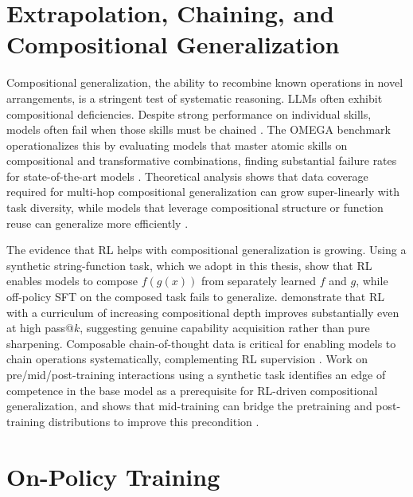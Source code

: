 \documentclass[12pt]{cmuthesis}
\begin{document}
\section{Extrapolation, Chaining, and Compositional Generalization}

Compositional generalization, the ability to recombine known operations in novel arrangements, is a stringent test of systematic reasoning.
LLMs often exhibit compositional deficiencies. Despite strong performance on individual skills, models often fail when those skills must be chained \citep{pressMeasuringNarrowingCompositionality2023,zhaoExploringCompositionalDeficiency2024}.
The OMEGA benchmark operationalizes this by evaluating models that master atomic skills on compositional and transformative combinations, finding substantial failure rates for state-of-the-art models \citep{sunOMEGACanLLMs2025}.
Theoretical analysis shows that data coverage required for multi-hop compositional generalization can grow super-linearly with task diversity, while models that leverage compositional structure or function reuse can generalize more efficiently \citep{abedsoltanTaskGeneralizationAutoRegressive2025}.

The evidence that RL helps with compositional generalization is growing.
Using a synthetic string-function task, which we adopt in this thesis, \citet{yuanLLMsLearnNewSkills2025} show that RL enables models to compose $f(g(x))$ from separately learned $f$ and $g$, while off-policy SFT on the composed task fails to generalize.
\citet{motwaniH1BootstrappingLLMs2025} demonstrate that RL with a curriculum of increasing compositional depth improves substantially even at high pass@$k$, suggesting genuine capability acquisition rather than pure sharpening.
Composable chain-of-thought data is critical for enabling models to chain operations systematically, complementing RL supervision \citep{yinLearningComposableChainsofThought2025}.
Work on pre/mid/post-training interactions using a synthetic task identifies an edge of competence in the base model as a prerequisite for RL-driven compositional generalization, and shows that mid-training can bridge the pretraining and post-training distributions to improve this precondition \citep{zhangInterplayPreTrainingMidTraining2025}.


\section{On-Policy Training}
\end{document}
